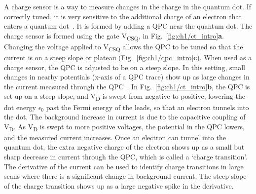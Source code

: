 A charge sensor is a way to measure changes in the charge in the quantum dot. If correctly tuned, it is very sensitive to the additional charge of an electron that enters a quantum dot~\cite{Field1993,Schleser2004,Vandersypen2004}. It is formed by adding a QPC near the quantum dot. The charge sensor is formed using the gate V\textsubscript{CSQ}, in Fig.~\ref{fig:ch1/ct_intro}\textbf{a}. Changing the voltage applied to V\textsubscript{CSQ} allows the QPC to be tuned so that the current is on a steep slope or plateau (Fig.~\ref{fig:ch1/qpc_intro}\textbf{c}). When used as a charge sensor, the QPC is adjusted to be on a steep slope. In this setting, small changes in nearby potentials (x-axis of a QPC trace) show up as large changes in the current measured through the QPC~\cite{cs_design}. In Fig.~\ref{fig:ch1/ct_intro}\textbf{b}, the QPC is set up on a steep slope, and V\textsubscript{D} is swept from negative to positive, lowering the dot energy $\epsilon_0$ past the Fermi energy of the leads, so that an electron tunnels into the dot. The background increase in current is due to the capacitive coupling of V\textsubscript{D}. As V\textsubscript{D} is swept to more positive voltages, the potential in the QPC lowers, and the measured current increases. Once an electron can tunnel into the quantum dot, the extra negative charge of the electron shows up as a small but sharp decrease in current through the QPC, which is called a `charge transition'. The derivative of the current can be used to identify charge transitions in large scans where there is a significant change in background current. The steep slope of the charge transition shows up as a large negative spike in the derivative. 


